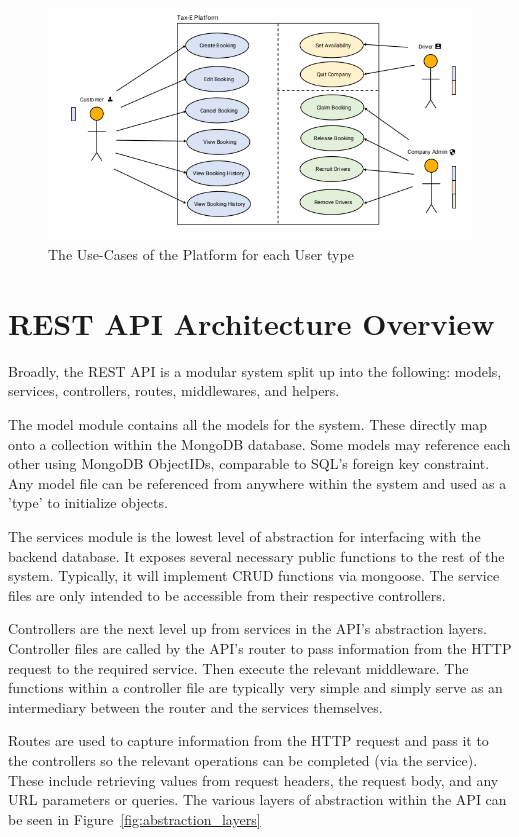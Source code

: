 \begin{figure}[!htb]
	\centering
	\includegraphics[width=0.75\linewidth]{Resources/img/overall_use-case.png}
	\caption{The Use-Cases of the Platform for each User type}
	\label{fig:overall_use-case}
\end{figure}


\section{REST API Architecture Overview}
Broadly, the REST API is a modular system split up into the following: models, services, controllers, routes, middlewares, and helpers.

The model module contains all the models for the system. These directly map onto a collection within the MongoDB database. Some models may reference each other using MongoDB ObjectIDs, comparable to SQL's foreign key constraint. Any model file can be referenced from anywhere within the system and used as a 'type' to initialize objects.

The services module is the lowest level of abstraction for interfacing with the backend database. It exposes several necessary public functions to the rest of the system. Typically, it will implement CRUD functions via mongoose. The service files are only intended to be accessible from their respective controllers.

Controllers are the next level up from services in the API's abstraction layers. Controller files are called by the API's router to pass information from the HTTP request to the required service. Then execute the relevant middleware. The functions within a controller file are typically very simple and simply serve as an intermediary between the router and the services themselves.

Routes are used to capture information from the HTTP request and pass it to the controllers so the relevant operations can be completed (via the service).  These include retrieving values from request headers, the request body, and any URL parameters or queries. The various layers of abstraction within the API can be seen in Figure~\ref{fig:abstraction_layers}

